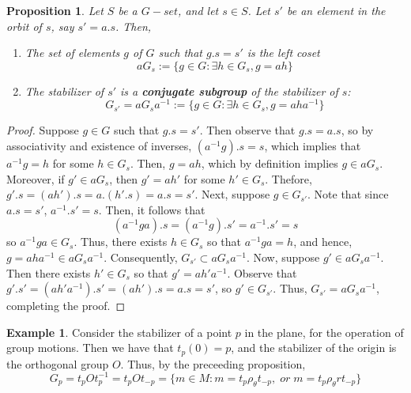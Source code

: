 \documentclass[12pt]{article}
\newtheorem{prop}[thm]{Proposition}
\theoremstyle{definition}
\newtheorem{eg}[thm]{Example}
\theoremstyle{remark}
\numberwithin{equation}{section}
\newcommand\B[1]{\textbf{ #1}}
\begin{document}
\vspace{15pt}



\begin{prop}
        Let $S$ be a $G-set$, and let $s \in S$. Let $s'$ be an element in the orbit of $s$, say $s' = a.s$. Then, \begin{enumerate}
                \item The set of elements $g$ of $G$ such that $g.s = s'$ is the left coset \begin{equation}
                                aG_s := \{g \in G: \exists h \in G_s, g = ah\}
                \end{equation}
                \item The stabilizer of $s'$ is a \B{conjugate subgroup} of the stabilizer of $s$: \begin{equation}
                                G_{s'} = aG_sa^{-1} := \{g \in G: \exists h \in G_s, g = aha^{-1}\}
                \end{equation}
        \end{enumerate}
\end{prop}
\begin{proof}
        Suppose $g \in G$ such that $g.s = s'$. Then observe that $g.s = a.s$, so by associativity and existence of inverses, $(a^{-1}g).s = s$, which implies that $a^{-1}g = h$ for some $h \in G_s$. Then, $g = ah$, which by definition implies $g \in aG_s$. Moreover, if $g' \in aG_s$, then $g' = ah'$ for some $h' \in G_s$. Thefore, $g'.s = (ah').s = a.(h'.s) = a.s = s'$. Next, suppose $g \in G_{s'}$. Note that since $a.s = s'$, $a^{-1}.s' = s$. Then, it follows that $$(a^{-1}ga).s = (a^{-1}g).s' = a^{-1}.s' = s$$ so $a^{-1}ga \in G_s$. Thus, there exists $h \in G_s$ so that $a^{-1}ga = h$, and hence, $g = aha^{-1} \in aG_sa^{-1}$. Consequently, $G_{s'} \subset aG_sa^{-1}$. Now, suppose $g' \in aG_sa^{-1}$. Then there exists $h' \in G_s$ so that $g' = ah'a^{-1}$. Observe that $g'.s' = (ah'a^{-1}).s' = (ah').s = a.s = s'$, so $g' \in G_{s'}$. Thus, $G_{s'} = aG_sa^{-1}$, completing the proof.
\end{proof}

\vspace{15pt}
\begin{eg}
        Consider the stabilizer of a point $p$ in the plane, for the operation of group motions. Then we have that $t_p(0) = p$, and the stabilizer of the origin is the orthogonal group $O$. Thus, by the preceeding proposition, \begin{equation}
                G_p = t_pOt_p^{-1} = t_pOt_{-p} = \{m \in M: m = t_p\rho_{\theta}t_{-p},\;or\;m=t_p\rho_{\theta}rt_{-p}\}
        \end{equation}
\end{eg}
\end{document}
